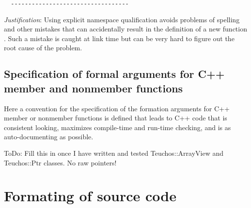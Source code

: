\begin{enumerate}
{\begin{verbatim}
  ----------------------------------
\end{verbatim}}

{}\textit{Justification}: Using explicit namespace qualification avoids
problems of spelling and other mistakes that can accidentally result in the
definition of a new function {}\cite[Section 8.2]{stroustrup00}.  Such a
mistake is caught at link time but can be very hard to figure out the root
cause of the problem.

%
\subsection{Specification of formal arguments for C++ member and nonmember functions}
%

Here a convention for the specification of the formation arguments for C++
member or nonmember functions is defined that leads to C++ code that is
consistent looking, maximizes compile-time and run-time checking, and is as
auto-documenting as possible.

ToDo: Fill this in once I have written and tested Teuchos::ArrayView and
Teuchos::Ptr classes.  No raw pointers!

\end{enumerate}
%
\section{Formating of source code}
\label{thyracodingguidelines:formatting:sec}
%

